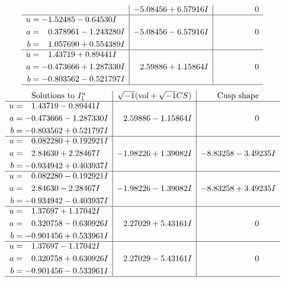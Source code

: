 \documentclass[1p]{elsarticle_modified}
\theoremstyle{definition}
\newcommand{\I}{\sqrt{-1}}
\begin{document}
$$\begin{array}{c|c|c}
 & -5.08456 + 6.57916 I & \phantom{-0.000000 } 0 \\ \hline\begin{aligned}
u &= -1.52485 - 0.64530 I \\
a &= \phantom{-}0.378961 - 1.243280 I \\
b &= \phantom{-}1.057690 + 0.554389 I\end{aligned}
 & -5.08456 - 6.57916 I & \phantom{-0.000000 } 0 \\ \hline\begin{aligned}
u &= \phantom{-}1.43719 + 0.89441 I \\
a &= -0.473666 + 1.287330 I \\
b &= -0.803562 - 0.521797 I\end{aligned}
 & \phantom{-}2.59886 + 1.15864 I & \phantom{-0.000000 } 0\\
 \hline 
 \end{array}$$\newpage$$\begin{array}{c|c|c}  
\text{Solutions to }I^u_{1}& \I (\text{vol} + \sqrt{-1}CS) & \text{Cusp shape}\\
 \hline 
\begin{aligned}
u &= \phantom{-}1.43719 - 0.89441 I \\
a &= -0.473666 - 1.287330 I \\
b &= -0.803562 + 0.521797 I\end{aligned}
 & \phantom{-}2.59886 - 1.15864 I & \phantom{-0.000000 } 0 \\ \hline\begin{aligned}
u &= \phantom{-}0.082280 + 0.192921 I \\
a &= \phantom{-}2.84630 + 2.28467 I \\
b &= -0.934942 + 0.403937 I\end{aligned}
 & -1.98226 + 1.39082 I & -8.83258 - 3.49235 I \\ \hline\begin{aligned}
u &= \phantom{-}0.082280 - 0.192921 I \\
a &= \phantom{-}2.84630 - 2.28467 I \\
b &= -0.934942 - 0.403937 I\end{aligned}
 & -1.98226 - 1.39082 I & -8.83258 + 3.49235 I \\ \hline\begin{aligned}
u &= \phantom{-}1.37697 + 1.17042 I \\
a &= \phantom{-}0.320758 - 0.630926 I \\
b &= -0.901456 + 0.533961 I\end{aligned}
 & \phantom{-}2.27029 + 5.43161 I & \phantom{-0.000000 } 0 \\ \hline\begin{aligned}
u &= \phantom{-}1.37697 - 1.17042 I \\
a &= \phantom{-}0.320758 + 0.630926 I \\
b &= -0.901456 - 0.533961 I\end{aligned}
 & \phantom{-}2.27029 - 5.43161 I & \phantom{-0.000000 } 0\\
 \hline 
 \end{array}$$\newpage\newpage\renewcommand{\arraystretch}{1}
\end{document}
